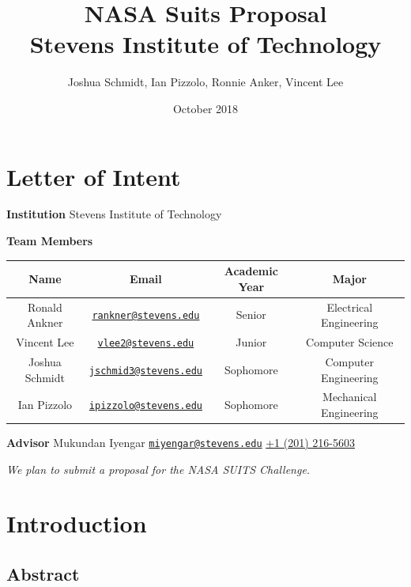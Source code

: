 \documentclass{article}
\title{%
	NASA Suits Proposal \\
	\large Stevens Institute of Technology}
\date{October 2018}
\author{Joshua Schmidt, Ian Pizzolo, Ronnie Anker, Vincent Lee}
\let\Oldsection\section
\renewcommand{\section}{\FloatBarrier\Oldsection}
\let\Oldsubsection\subsection
\renewcommand{\subsection}{\FloatBarrier\Oldsubsection}
\begin{document}
\maketitle

\tableofcontents

\section{Letter of Intent}



\begin{center}

\bigskip
\bigskip
\textbf{Institution}
Stevens Institute of Technology
\bigskip

\textbf{Team Members}
\bigskip
\bigskip
\begin{tabular}{||c c c c||} 
 \hline
 Name & Email & Academic Year & Major \\ [0.5ex] 
 \hline\hline
 Ronald Ankner & \href{mailto:rankner@stevens.edu}{\nolinkurl{rankner@stevens.edu}} & Senior & Electrical Engineering \\ 
 \hline
 Vincent Lee & \href{mailto:vlee2@stevens.edu}{\nolinkurl{vlee2@stevens.edu}} & Junior & Computer Science \\
 \hline
 Joshua Schmidt & \href{mailto:jschmid3@stevens.edu}{\nolinkurl{jschmid3@stevens.edu}} & Sophomore & Computer Engineering \\
 \hline
 Ian Pizzolo & \href{mailto:ipizzolo@stevens.edu}{\nolinkurl{ipizzolo@stevens.edu}} & Sophomore & Mechanical Engineering \\
 \hline
\end{tabular}

\bigskip
\bigskip

\textbf{Advisor}
\bigskip
Mukundan Iyengar\newline
\href{mailto:miyengar@stevens.edu}{\nolinkurl{miyengar@stevens.edu}}\newline
\href{tel:12012165603}{+1 (201) 216-5603}

\bigskip
\bigskip
\textit{We plan to submit a proposal for the NASA SUITS Challenge.}

\end{center}

\section{Introduction}

\subsection{Abstract}
\end{document}
